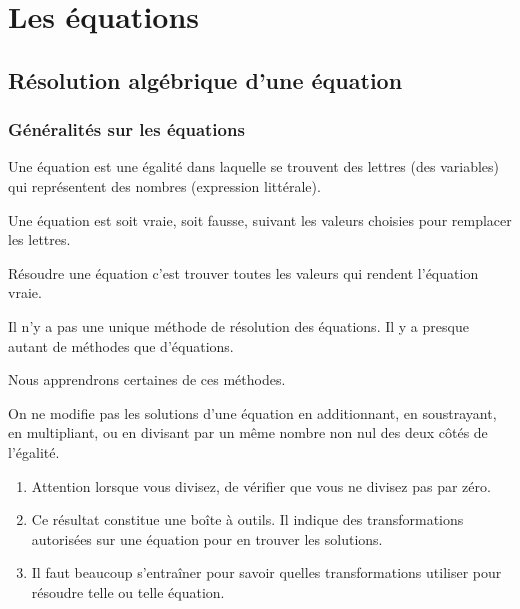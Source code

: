 \documentclass[a4paper,10pt]{report}
\begin{document}
\newpage
\setcounter{chapter}{16}
\chapter{Les équations}

\section{Résolution algébrique d'une équation}

\subsection{Généralités sur les équations}

\begin{defn}
Une équation est une égalité dans laquelle se trouvent des lettres (des variables) qui représentent des nombres (expression littérale).

\noindent Une équation est soit vraie, soit fausse, suivant les valeurs choisies pour remplacer les lettres.

\noindent Résoudre une équation c'est trouver toutes les valeurs qui rendent l'équation vraie.
\end{defn}

\medskip
Il n'y a pas une unique méthode de résolution des équations. Il y a presque autant de méthodes que d'équations.

\noindent Nous apprendrons certaines de ces méthodes.

\begin{prop}
On ne modifie pas les solutions d'une équation en additionnant, en soustrayant, en multipliant, ou en divisant par un même nombre non nul des deux côtés de l'égalité.
\end{prop}
 
\begin{rem}
\begin{enumerate}
\item[•] Attention lorsque vous divisez, de vérifier que vous ne divisez pas par zéro.
\item[•] Ce résultat constitue une boîte à outils. Il indique des transformations autorisées sur une équation pour en trouver les solutions.
\item[•] Il faut beaucoup s'entraîner pour savoir quelles transformations utiliser pour résoudre telle ou telle équation.
\end{enumerate}
\end{rem}
\end{document}
